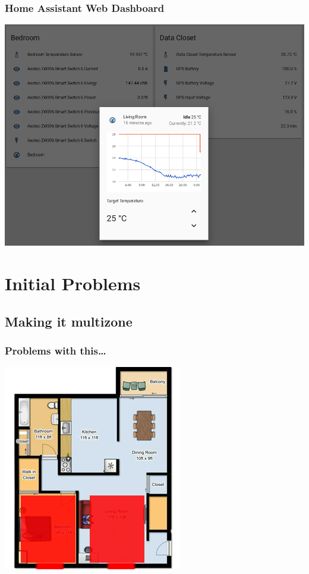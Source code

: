 \documentclass[aspectratio=169,11pt,hyperref={colorlinks=true}]{beamer}
\begin{document}
\begin{frame}
    \frametitle{Home Assistant Web Dashboard}
    \begin{center}
        \includegraphics[width=.75\textwidth]{Control_panel_trimmed.png}
    \end{center}
\end{frame}

\section{Initial Problems}
\subsection{Making it multizone}
\begin{frame}
    \frametitle{Problems with this\dots}
    \begin{center}
    \includegraphics[height=.85\textheight]{floorplan-zones.png}
    \end{center}
\end{frame}
\end{document}
